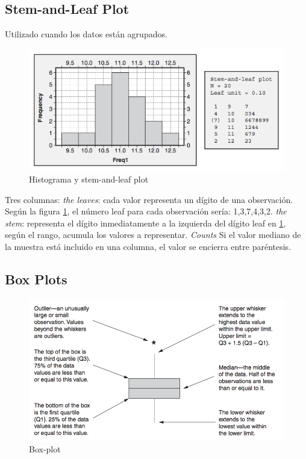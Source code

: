 \documentclass[oneside]{book}
\begin{document}
\subsection{Stem-and-Leaf Plot}

Utilizado cuando los datos están agrupados.

\begin{figure}[ht!]
	\centering
	\includegraphics[width=120mm]{imagenes/Histograma.png}
	\caption{Histograma y stem-and-leaf plot}
	\label{fig:Histogramaystemandleafplot}
\end{figure}

Tres columnas: \textit{the leaves}: cada valor representa un dígito de una observación. Según la figura \ref{fig:Histogramaystemandleafplot}, el número leaf para cada observación sería: 1,3,7,4,3,2. \textit{the stem}: representa el dígito inmediatamente a la izquierda del dígito leaf en \ref{fig:Histogramaystemandleafplot}, según el rango, acumula los valores a representar. \textit{Counts} Si el valor mediano de la muestra está incluido en una columna, el valor se encierra entre paréntesis. 

\subsection{Box Plots}

\begin{figure}[H]
	\centering
	\includegraphics[width=120mm]{imagenes/Box-plot.png}
	\caption{Box-plot}
	\label{fig:Box-plot}
\end{figure}
\end{document}
